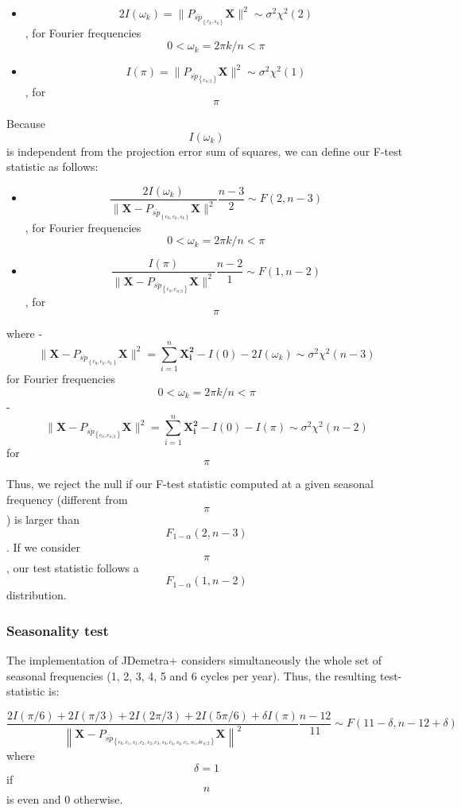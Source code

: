 \documentclass[
]{book}
\providecommand{\tightlist}{%
  \setlength{\itemsep}{0pt}\setlength{\parskip}{0pt}}
\begin{document}
\begin{itemize}
\tightlist
\item
  \[ 2I(\omega_{k})= \| P_{\bar{sp}_{\left\{ c_{k},s_{k} \right\}}} \mathbf{X} \|^{2}  \sim \sigma^{2} \chi^{2}(2) \], for Fourier frequencies
  \[ 0 < \omega_{k}=2\pi k/n < \pi \]
\item
  \[ I(\pi)= \| P_{\bar{sp}_{\left\{ e_{n/2} \right\}}} \mathbf{X} \|^{2}  \sim \sigma^{2} \chi^{2}(1) \], for \[ \pi \]
\end{itemize}

Because \[ I(\omega_{k}) \] is independent from the projection error sum of squares, we can define our F-test statistic as follows:

\begin{itemize}
\tightlist
\item
  \[ \frac{ 2I(\omega_{k})}{\|\mathbf{X}-P_{\bar{sp}_{\left\{ e_0,c_{k},s_{k} \right\}}} \mathbf{X}\|^2} \frac{n-3}{2} \sim F(2,n-3) \], for Fourier frequencies
  \[ 0 < \omega_{k}=2\pi k/n < \pi \]
\item
  \[ \frac{ I(\pi)}{\|\mathbf{X}-P_{\bar{sp}_{\left\{ e_0,e_{n/2} \right\}}} \mathbf{X}\|^2} \frac{n-2}{1} \sim F(1,n-2)\], for \[ \pi \]
\end{itemize}

where
- \[ \|\mathbf{X}-P_{\bar{sp}_{\left\{ e_0,c_{k},s_{k} \right\}}} \mathbf{X}\|^2  = \sum_{i=1}^{n}\mathbf{X^2_i}-I(0)-2I(\omega_{k}) \sim \sigma^{2} \chi^{2}(n-3)\] for Fourier frequencies
\[ 0 < \omega_{k}=2\pi k/n < \pi \]
- \[ \|\mathbf{X}-P_{\bar{sp}_{\left\{ e_0,e_{n/2} \right\}}} \mathbf{X}\|^2 = \sum_{i=1}^{n}\mathbf{X^2_i}-I(0)-I(\pi) \sim \sigma^{2} \chi^{2}(n-2)  \] for \[ \pi \]

Thus, we reject the null if our F-test statistic computed at a given seasonal frequency (different from \[ \pi \]) is larger than \[ F_{1-α}(2,n-3)\].
If we consider \[ \pi  \], our test statistic follows a \[ F_{1-α}(1,n-2)\] distribution.

\hypertarget{seasonality-test}{%
\subsubsection{Seasonality test}\label{seasonality-test}}

The implementation of JDemetra+ considers simultaneously the whole set of seasonal frequencies (1, 2, 3, 4, 5 and 6 cycles per year). Thus, the resulting test-statistic is:

\[
 \frac{ 2I(\pi/6)+ 2I(\pi/3)+ 2I(2\pi/3)+ 2I(5\pi/6)+ \delta I(\pi)}{\left\|\mathbf{X}-P_{\bar{sp}_{\left\{ e_0,c_{1},s_{1},c_{2},s_{2},c_{3},s_{3},c_{4},s_{4},c_{5},s_{5}, \delta e_{n/2} \right\}}} \mathbf{X} \right\|^2} \frac{n-12}{11} \sim F(11-\delta,n-12+\delta) 
\]
where \[ \delta=1 \] if \[ n \] is even and 0 otherwise.
\end{document}
